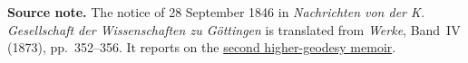\par\medskip\begin{small}\noindent\textbf{Source note.} The notice of 28 September 1846 in \textit{Nachrichten von der K. Gesellschaft der Wissenschaften zu Göttingen} is translated from \textit{Werke}, Band~IV (1873), pp.~352--356. It reports on the \hyperlink{geodaesie2.0}{second higher-geodesy memoir}.\par\end{small}

